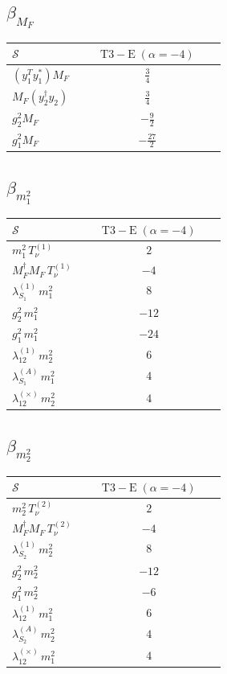 \documentclass[9pt]{article}
\begin{document}
\subsection*{$ \beta_{M_F} $}
\begin{longtable}{@{}p{0.31\linewidth}c@{}}
\toprule
$\mathcal{S}$ & $ \mathrm{T3-E}\;(\alpha=-4) $ \\
\midrule
$ (y_1^T y_1^*)M_F $ & $ \frac{3}{4} $ \\
$ M_F(y_2^\dagger y_2) $ & $ \frac{3}{4} $ \\
$ g_2^2M_F $ & $ - \frac{9}{2} $ \\
$ g_1^2M_F $ & $ - \frac{27}{2} $ \\
\bottomrule
\end{longtable}
\subsection*{$ \beta_{m_1^{2}} $}
\begin{longtable}{@{}p{0.31\linewidth}c@{}}
\toprule
$\mathcal{S}$ & $ \mathrm{T3-E}\;(\alpha=-4) $ \\
\midrule
$ m_1^{2}\,T_{\nu}^{(1)} $ & $ 2 $ \\
$ M_F^\dagger M_F\,T_{\nu}^{(1)} $ & $ -4 $ \\
$ \lambda_{S_1}^{(1)}\,m_1^{2} $ & $ 8 $ \\
$ g_2^2\,m_1^{2} $ & $ -12 $ \\
$ g_1^2\,m_1^{2} $ & $ -24 $ \\
$ \lambda_{12}^{(1)}\,m_2^{2} $ & $ 6 $ \\
$ \lambda_{S_1}^{(A)}\,m_1^{2} $ & $ 4 $ \\
$ \lambda_{12}^{(\times)}\,m_2^{2} $ & $ 4 $ \\
\bottomrule
\end{longtable}
\subsection*{$ \beta_{m_2^{2}} $}
\begin{longtable}{@{}p{0.31\linewidth}c@{}}
\toprule
$\mathcal{S}$ & $ \mathrm{T3-E}\;(\alpha=-4) $ \\
\midrule
$ m_2^{2}\,T_{\nu}^{(2)} $ & $ 2 $ \\
$ M_F^\dagger M_F\,T_{\nu}^{(2)} $ & $ -4 $ \\
$ \lambda_{S_2}^{(1)}\,m_2^{2} $ & $ 8 $ \\
$ g_2^2\,m_2^{2} $ & $ -12 $ \\
$ g_1^2\,m_2^{2} $ & $ -6 $ \\
$ \lambda_{12}^{(1)}\,m_1^{2} $ & $ 6 $ \\
$ \lambda_{S_2}^{(A)}\,m_2^{2} $ & $ 4 $ \\
$ \lambda_{12}^{(\times)}\,m_1^{2} $ & $ 4 $ \\
\bottomrule
\end{longtable}
\end{document}
